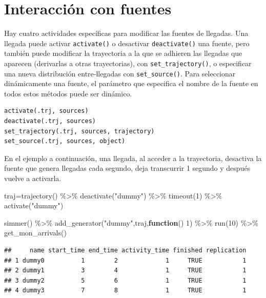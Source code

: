 \documentclass[
]{book}
\newenvironment{Shaded}{\begin{snugshade}}{\end{snugshade}}
\newcommand{\ControlFlowTok}[1]{\textcolor[rgb]{0.13,0.29,0.53}{\textbf{#1}}}
\newcommand{\DecValTok}[1]{\textcolor[rgb]{0.00,0.00,0.81}{#1}}
\newcommand{\FunctionTok}[1]{\textcolor[rgb]{0.00,0.00,0.00}{#1}}
\newcommand{\NormalTok}[1]{#1}
\newcommand{\OtherTok}[1]{\textcolor[rgb]{0.56,0.35,0.01}{#1}}
\newcommand{\SpecialCharTok}[1]{\textcolor[rgb]{0.00,0.00,0.00}{#1}}
\newcommand{\StringTok}[1]{\textcolor[rgb]{0.31,0.60,0.02}{#1}}
\theoremstyle{definition}
\theoremstyle{definition}
\theoremstyle{definition}
\theoremstyle{definition}
\theoremstyle{remark}
\begin{document}
\hypertarget{interacciuxf3n-con-fuentes}{%
\section{Interacción con fuentes}\label{interacciuxf3n-con-fuentes}}

Hay cuatro actividades específicas para modificar las fuentes de llegadas. Una llegada puede activar \texttt{activate()} o desactivar \texttt{deactivate()} una fuente, pero también puede modificar la trayectoria a la que se adhieren las llegadas que aparecen (derivarlas a otras trayectorias), con \texttt{set\_trajectory()}, o especificar una nueva distribución entre-llegadas con \texttt{set\_source()}. Para seleccionar dinámicamente una fuente, el parámetro que especifica el nombre de la fuente en todos estos métodos puede ser dinámico.

\begin{verbatim}
activate(.trj, sources)
deactivate(.trj, sources)
set_trajectory(.trj, sources, trajectory)
set_source(.trj, sources, object)  
\end{verbatim}

En el ejemplo a continuación, una llegada, al acceder a la trayectoria, desactiva la fuente que genera llegadas cada segundo, deja transcurrir 1 segundo y después vuelve a activarla.

\begin{Shaded}
\begin{Highlighting}[]
\NormalTok{traj}\OtherTok{=}\FunctionTok{trajectory}\NormalTok{() }\SpecialCharTok{\%\textgreater{}\%}
  \FunctionTok{deactivate}\NormalTok{(}\StringTok{"dummy"}\NormalTok{) }\SpecialCharTok{\%\textgreater{}\%} 
  \FunctionTok{timeout}\NormalTok{(}\DecValTok{1}\NormalTok{) }\SpecialCharTok{\%\textgreater{}\%} 
  \FunctionTok{activate}\NormalTok{(}\StringTok{"dummy"}\NormalTok{) }

\FunctionTok{simmer}\NormalTok{() }\SpecialCharTok{\%\textgreater{}\%}
  \FunctionTok{add\_generator}\NormalTok{(}\StringTok{"dummy"}\NormalTok{,traj,}\ControlFlowTok{function}\NormalTok{() }\DecValTok{1}\NormalTok{) }\SpecialCharTok{\%\textgreater{}\%} 
  \FunctionTok{run}\NormalTok{(}\DecValTok{10}\NormalTok{) }\SpecialCharTok{\%\textgreater{}\%} 
  \FunctionTok{get\_mon\_arrivals}\NormalTok{()}
\end{Highlighting}
\end{Shaded}

\begin{verbatim}
##     name start_time end_time activity_time finished replication
## 1 dummy0          1        2             1     TRUE           1
## 2 dummy1          3        4             1     TRUE           1
## 3 dummy2          5        6             1     TRUE           1
## 4 dummy3          7        8             1     TRUE           1
\end{verbatim}
\end{document}
